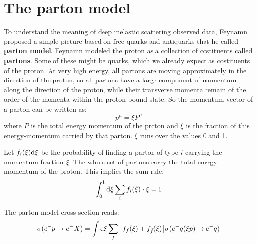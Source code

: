 \documentclass[../../main/main.tex]{subfiles}
\begin{document}
\section{The parton model}
To understand the meaning of deep inelastic scattering observed data, Feynamn proposed a simple picture based on free quarks and antiquarks that he called \textbf{parton model}. Feynamn modeled the proton as a collection of costituents called \textbf{partons}. Some of these might be quarks, which we already expect as costituents of the proton. At very high energy, all partons are moving approximately in the direction of the proton, so all partons have a large component of momentum along the direction of the proton, while their transverse momenta remain of the order of the momenta within the proton bound state. So the momentum vector of a parton can be written as:
\begin{equation}
	p^\mu
	=
	\xi P^\mu
	\label{eq:}
\end{equation}
where \( P \) is the total energy momentum of the proton and \( \xi \) is the fraction of this energy-momentum carried by that parton. \( \xi \) runs over the values 0 and 1.

Let \( f_i(\xi)\mathrm{d}{\xi} \) be the probability of finding a parton of type \( i \) carrying the momentum fraction \( \xi \). The whole set of partons carry the total energy-momentum of the proton. This implies the sum rule:
\begin{equation}
	\int_{0}^{1} \mathrm{d}{\xi} \sum_{i} f_i(\xi) \cdot \xi
	=
	1
	\label{eq:}
\end{equation}

The parton model cross section reads:
\begin{equation}
	\sigma(e^-p \rightarrow e^-X)
	=
	\int \mathrm{d}{\xi} \sum_{f} \qty[f_f(\xi) + f_{\bar{f}}(\xi)] \sigma(e^-q(\xi p) \rightarrow e^-q)
	\label{eq:}
\end{equation}
\end{document}
